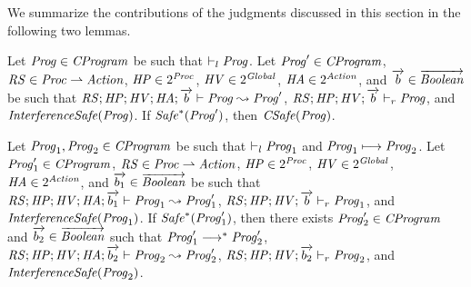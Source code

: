 We summarize the contributions of the judgments discussed in this section in the following two lemmas.
\begin{lemma}
Let $\mathit{Prog} \in \mathit{CProgram}$ be such that $\vdash_l \mathit{Prog}$.
Let $\mathit{Prog}' \in \mathit{CProgram}$, $\mathit{RS} \in \mathit{Proc} \rightharpoonup \mathit{Action}$, $\mathit{HP} \in 2^{\mathit{Proc}}$, $\mathit{HV} \in 2^{\mathit{Global}}$, $\mathit{HA} \in 2^{\mathit{Action}}$,
and $\overrightarrow{b} \in \overrightarrow{\mathit{Boolean}}$ be such that 
$\mathit{RS};\mathit{HP};\mathit{HV};\mathit{HA};\overrightarrow{b} \vdash \mathit{Prog} \leadsto \mathit{Prog}'$, $\mathit{RS};\mathit{HP};\mathit{HV};\overrightarrow{b} \vdash_r \mathit{Prog}$, and
$\mathit{InterferenceSafe}(\mathit{Prog})$.
If $\mathit{Safe}^*(\mathit{Prog}')$, then $\mathit{CSafe}(\mathit{Prog})$.
\end{lemma}

\begin{lemma}
Let $\mathit{Prog}_1,\mathit{Prog}_2 \in \mathit{CProgram}$ be such that $\vdash_l \mathit{Prog}_1$ and $\mathit{Prog}_1 \longmapsto \mathit{Prog}_2$.
Let $\mathit{Prog}'_1 \in \mathit{CProgram}$, $\mathit{RS} \in \mathit{Proc} \rightharpoonup \mathit{Action}$, $\mathit{HP} \in 2^{\mathit{Proc}}$, $\mathit{HV} \in 2^{\mathit{Global}}$, $\mathit{HA} \in 2^{\mathit{Action}}$,
and $\overrightarrow{b_1} \in \overrightarrow{\mathit{Boolean}}$ be such that 
$\mathit{RS};\mathit{HP};\mathit{HV};\mathit{HA};\overrightarrow{b_1} \vdash \mathit{Prog}_1 \leadsto \mathit{Prog}'_1$, $\mathit{RS};\mathit{HP};\mathit{HV};\overrightarrow{b} \vdash_r \mathit{Prog}_1$, and
$\mathit{InterferenceSafe}(\mathit{Prog}_1)$.
If $\mathit{Safe}^*(\mathit{Prog}'_1)$, then there exists $\mathit{Prog}'_2 \in \mathit{CProgram}$ and $\overrightarrow{b_2} \in \overrightarrow{\mathit{Boolean}}$ such that 
$\mathit{Prog}'_1 \longrightarrow^* \mathit{Prog}'_2$, $\mathit{RS};\mathit{HP};\mathit{HV};\mathit{HA};\overrightarrow{b_2} \vdash \mathit{Prog}_2 \leadsto \mathit{Prog}'_2$, 
$\mathit{RS};\mathit{HP};\mathit{HV};\overrightarrow{b_2} \vdash_r \mathit{Prog}_2$, and $\mathit{InterferenceSafe}(\mathit{Prog}_2)$.
\end{lemma}


